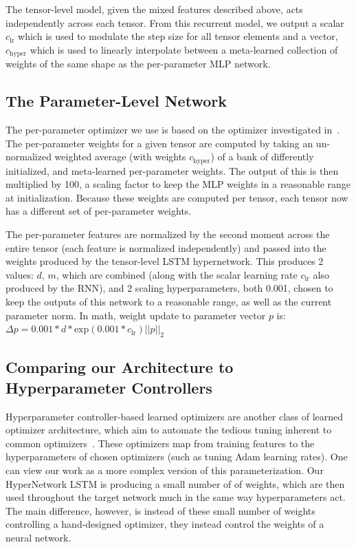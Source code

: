\documentclass[11pt]{article}
\begin{document}
The tensor-level model, given the mixed features described above, acts independently across each tensor. 
From this recurrent model, we output a scalar $c_{\text{lr}}$ which is used to modulate the step size for all tensor elements and a vector, $c_\text{hyper}$ which is used to linearly interpolate between a meta-learned collection of weights of the same shape as the per-parameter MLP network.

\subsection{The Parameter-Level Network}
The per-parameter optimizer we use is based on the optimizer investigated in~\citet{metz2022practical}.
The per-parameter weights for a given tensor are computed by taking an un-normalized weighted average (with weights $c_\text{hyper}$) of a bank of differently initialized, and meta-learned per-parameter weights.
The output of this is then multiplied by 100, a scaling factor to keep the MLP weights in a reasonable range at initialization.
Because these weights are computed per tensor, each tensor now has a different set of per-parameter weights.

The per-parameter features are normalized by the second moment across the entire tensor (each feature is normalized independently) and passed into the weights produced by the tensor-level LSTM hypernetwork.
This produces 2 values: $d$, $m$, which are combined (along with the scalar learning rate $c_{\text{lr}}$ also produced by the RNN), and 2 scaling hyperparameters, both 0.001, chosen to keep the outputs of this network to a reasonable range, as well as the current parameter norm.
In math, weight update to parameter vector $p$ is: $\Delta p = 0.001 * d * \text{exp}(0.001 * c_{\text{lr}}) ||p||_2$

\subsection{Comparing our Architecture to Hyperparameter Controllers} \label{app:compare_architecture_capacity}
Hyperparameter controller-based learned optimizers are another class of learned optimizer architecture, which aim to automate the tedious tuning inherent to common optimizers~\citet{daniel2016learning, xu2019learning, almeida2021generalizable}.
These optimizers map from training features to the hyperparameters of chosen optimizers (such as tuning Adam learning rates). 
One can view our work as a more complex version of this parameterization.
Our HyperNetwork LSTM is producing a small number of of weights, which are then used throughout the target network much in the same way hyperparameters act. The main difference, however, is instead of these small number of weights controlling a hand-designed optimizer, they instead control the weights of a neural network.
\end{document}
